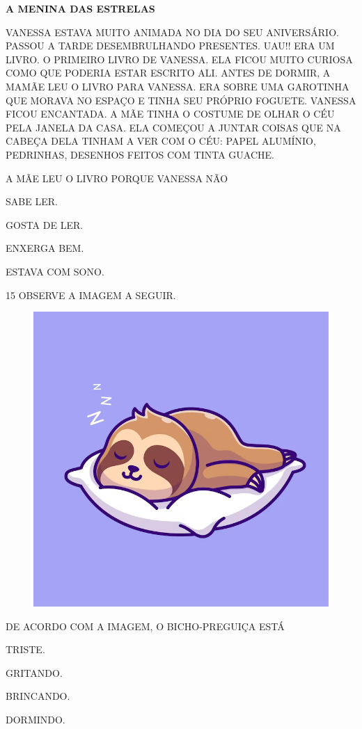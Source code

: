 \begin{myquote}
\textbf{A MENINA DAS ESTRELAS}

VANESSA ESTAVA MUITO ANIMADA NO DIA DO SEU ANIVERSÁRIO. PASSOU A TARDE DESEMBRULHANDO PRESENTES. UAU!! ERA UM LIVRO. O PRIMEIRO LIVRO DE VANESSA. ELA FICOU MUITO CURIOSA COMO QUE PODERIA ESTAR ESCRITO ALI.
ANTES DE DORMIR, A MAMÃE LEU O LIVRO PARA VANESSA. ERA SOBRE UMA GAROTINHA QUE MORAVA NO ESPAÇO E TINHA SEU PRÓPRIO FOGUETE. VANESSA FICOU ENCANTADA. A MÃE TINHA O COSTUME DE OLHAR O CÉU PELA JANELA DA CASA. ELA COMEÇOU A JUNTAR COISAS QUE NA CABEÇA DELA TINHAM A VER COM O CÉU: PAPEL ALUMÍNIO, PEDRINHAS, DESENHOS FEITOS COM TINTA GUACHE.

\end{myquote}

\pagebreak
A MÃE LEU O LIVRO PORQUE VANESSA NÃO

\begin{escolha}

\item SABE LER.

\item GOSTA DE LER.

\item ENXERGA BEM.

\item ESTAVA COM SONO.

\end{escolha}

\num{15} OBSERVE A IMAGEM A SEGUIR.

\begin{figure}[H]
\centering
\includegraphics[width=.8\textwidth]{./media/image245.png}
\end{figure}

DE ACORDO COM A IMAGEM, O BICHO-PREGUIÇA ESTÁ

\begin{escolha}

\item TRISTE.

\item GRITANDO.

\item BRINCANDO.

\item DORMINDO.

\end{escolha}